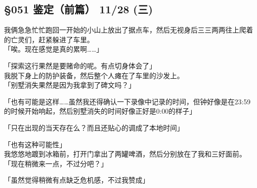 \subsection{§051 鉴定（前篇） 11/28 (三)}

我俩急急忙忙跑回一开始的小山上放出了据点车，然后无视身后三三两两往上爬着的亡灵们，赶紧躲进了车里。\\

「唉。现在感觉是真的累啊……」

「探索这行果然是要赌命的呢。有点切身体会了」\\

我脱下身上的防护装备，然后整个人瘫在了车里的沙发上。\\

「别墅消失果然是因为我拿到了碑文吗？」

「也有可能是这样……虽然我还得确认一下录像中记录的时间，但钟好像是在23:59的时候开始响起，然后别墅消失的时间好像正好是0:00的样子」

「只在出现的当天存在么？而且还贴心的调成了本地时间」

「也有这种可能性」\\

我悠悠地踱到冰箱前，打开门拿出了两罐啤酒，然后分别放在了我和三好面前。\\

「现在稍微来一点，不过分吧？」

「虽然觉得稍微有点缺乏危机感，不过我赞成」\\

